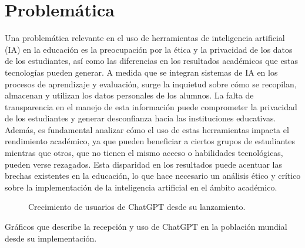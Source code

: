 \documentclass{article}
\begin{document}
\newpage

\section{Problemática}

Una problemática relevante en el uso de herramientas de inteligencia artificial (IA) en la educación es la preocupación por la ética y la privacidad de los datos de los estudiantes, así como las diferencias en los resultados académicos que estas tecnologías pueden generar. A medida que se integran sistemas de IA en los procesos de aprendizaje y evaluación, surge la inquietud sobre cómo se recopilan, almacenan y utilizan los datos personales de los alumnos. La falta de transparencia en el manejo de esta información puede comprometer la privacidad de los estudiantes y generar desconfianza hacia las instituciones educativas. Además, es fundamental analizar cómo el uso de estas herramientas impacta el rendimiento académico, ya que pueden beneficiar a ciertos grupos de estudiantes mientras que otros, que no tienen el mismo acceso o habilidades tecnológicas, pueden verse rezagados. Esta disparidad en los resultados puede acentuar las brechas existentes en la educación, lo que hace necesario un análisis ético y crítico sobre la implementación de la inteligencia artificial en el ámbito académico.

\begin{figure}[ht]
  \centering
  \caption{Crecimiento de usuarios de ChatGPT desde su lanzamiento.}
  \label{fig:usuarios_chatgpt}
\end{figure}
  Gráficos que describe la recepción y uso de ChatGPT en la población mundial desde su implementación.
\end{document}

